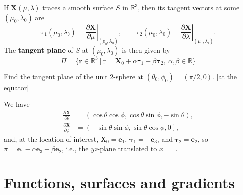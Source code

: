 \documentclass[letter-paper]{tufte-book}
\newenvironment{example}[1][Example]{\begin{trivlist}
\item[\hskip \labelsep {\bfseries #1}]}{\end{trivlist}}
\newcommand{\dy}{\partial}
\newcommand{\ddy}[2]{\frac{\dy#1}{\dy#2}}
\newcommand{\eb}{\boldsymbol{e}}
\newcommand{\Xb}{\boldsymbol{X}}
\newcommand\Def[1]{\textbf{#1}}
\begin{document}
If $\Xb(\mu,\lambda)$ traces a smooth surface $S$ in $\mathbb{R}^3$, then its
tangent vectors at some $(\mu_0,\lambda_0)$ are
\begin{equation*}
	\boldsymbol{\tau}_1 (\mu_0,\lambda_0)
	=\left.\ddy{\Xb}{\mu}\right|_{(\mu_0,\lambda_0)},\qquad
	\boldsymbol{\tau}_2 (\mu_0,\lambda_0)
	=\left.\ddy{\Xb}{\lambda}\right|_{(\mu_0,\lambda_0)}.
\end{equation*}
The \Def{tangent plane} of $S$ at $(\mu_0,\lambda_0)$ is then given by
\begin{equation*}
	\Pi=\{\boldsymbol{r}\in\mathbb{R}^3\ |\ \boldsymbol{r}=\Xb_0 
	+ \alpha \boldsymbol{\tau}_1 + \beta \boldsymbol{\tau}_2,\
	\alpha,\beta\in\mathbb{R}\}
\end{equation*}
\begin{example}
	Find the tangent plane of the unit 2-sphere at
	$(\theta_0,\phi_0)=(\pi/2,0)$. [at the equator]
	
	We have
	\begin{align*}
		\ddy{\Xb}{\theta} &= (\cos\theta\cos\phi,\cos\theta\sin\phi,-\sin\theta),\\
		\ddy{\Xb}{\phi} &= (-\sin\theta\sin\phi,\sin\theta\cos\phi,0),
	\end{align*}
	and, at the location of interest, $\Xb_0=\eb_1$,
	$\boldsymbol{\tau}_1=-\eb_3$, and $\boldsymbol{\tau}_2=\eb_2$, so
	$\pi=\eb_1-\alpha\eb_3+\beta\eb_2$, i.e., the $yz$-plane translated to
	$x=1$.
\end{example}


\section{Functions, surfaces and gradients}
\end{document}
